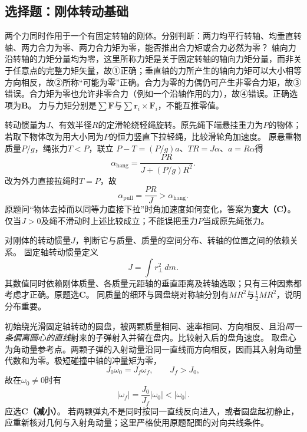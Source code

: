 
\subsection{选择题：刚体转动基础}

\problemtext 两个力同时作用于一个有固定转轴的刚体。分别判断：两力均平行转轴、均垂直转轴、两力合力为零、两力合力矩为零，能否推出合力矩或合力必然为零？
\workings
轴向力沿转轴的力矩分量均为零，这里所称力矩是关于固定转轴的轴向力矩分量，而非关于任意点的完整力矩矢量，故①正确；垂直轴的力所产生的轴向力矩可以大小相等方向相反，故②所称“可能为零”正确。合力为零的力偶仍可产生非零合力矩，故③错误。合力矩为零也允许非零合力（例如一个沿轴作用的力），故④错误。正确选项为\textbf{B}。
\crosscheck 力与力矩分别是$\sum\bm F$与$\sum\bm r_i\times\bm F_i$，不能互推零值。

\problemtext 转动惯量为$J$、有效半径$R$的定滑轮绕轻绳旋转。原先绳下端悬挂重力为$P$的物体；若取下物体改为用大小同为$P$的恒力竖直下拉轻绳，比较滑轮角加速度。
\workings
原悬重物质量$P/g$，绳张力$T<P$，联立
$P-T=(P/g)a$、$TR=J\alpha$、$a=R\alpha$得
\[
\alpha_{\mathrm{hang}}=\frac{PR}{J+(P/g)R^2}.
\]
改为外力直接拉绳时$T=P$，故
\[
\alpha_{\mathrm{pull}}=\frac{PR}{J}>\alpha_{\mathrm{hang}}.
\]
原题问“物体去掉而以同等力直接下拉”时角加速度如何变化，答案为\textbf{变大（C）}。
\crosscheck 仅当$J>0$及绳不滑动时上述比较成立；不能误把重力$P$当成原先绳张力。

\problemtext 对刚体的转动惯量$J$，判断它与质量、质量的空间分布、转轴的位置之间的依赖关系。
\workings
固定轴转动惯量定义
\[
J=\int r_\perp^2\,dm.
\]
其数值同时依赖刚体质量、各质量元距轴的垂直距离及转轴选取；只有三种因素都考虑才正确。原题选\textbf{C}。
\crosscheck 同质量的细环与圆盘绕对称轴分别有$MR^2$与$\frac12MR^2$，说明分布重要。

\problemtext 初始绕光滑固定轴转动的圆盘，被两颗质量相同、速率相同、方向相反、且沿\emph{同一条偏离圆心的直线}射来的子弹射入并留在盘内。比较射入后的盘角速度。
\workings
取盘心为角动量参考点。两颗子弹的入射动量沿同一直线而方向相反，因而其入射角动量代数和为零。极短碰撞中轴的冲量矩为零，
\[
J_0\omega_0=J_f\omega_f,\qquad J_f>J_0,
\]
故在$\omega_0\ne0$时有
\[
\boxed{|\omega_f|=\frac{J_0}{J_f}|\omega_0|<|\omega_0|}.
\]
应选\textbf{C（减小）}。
\crosscheck 若两颗弹丸不是同时按同一直线反向进入，或者圆盘起初静止，应重新核对几何与入射角动量；这里严格使用原题配图的对向共线条件。

